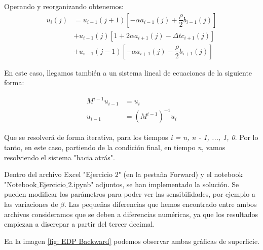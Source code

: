\documentclass[titlepage]{article}
\begin{document}
Operando y reorganizando obtenemos:
\begin{align*}
	u_{i}(j) &=  u_{i-1}(j+1)[-\alpha a_{i-1}(j) + \dfrac{\rho}{2} b_{i-1}(j)] \\ 
	& + u_{i-1}(j)[1 + 2  \alpha a_{i+1}(j) - \Delta t c_{i+1}(j)] \\
	& + u_{i-1}(j-1) [-\alpha a_{i+1}(j) - \dfrac{\rho}{2} b_{i+1}(j)]
\end{align*}

En este caso, llegamos también a un sistema lineal de ecuaciones de la siguiente forma:

\begin{align*}
	M^{i-1}u_{i-1} &= u_{i} \\
	u_{i-1} &= (M^{i-1})^{-1} u_{i}
\end{align*}

Que se resolverá de forma iterativa, para los tiempos \textit{i = n, n - 1, ..., 1, 0}. Por lo tanto, en este caso, partiendo de la condición final, en tiempo \textit{n}, vamos resolviendo el sistema "hacia atrás".

\vspace{5pt}
Dentro del archivo Excel "Ejercicio 2" (en la pestaña Forward) y el notebook "Notebook$\_$Ejercicio$\_$2.ipynb" adjuntos, se han implementado la solución. Se pueden modificar los parámetros para poder ver las sensibilidades, por ejemplo a las variaciones de $\beta$. Las pequeñas diferencias que hemos encontrado entre ambos archivos consideramos que se deben a diferencias numéricas, ya que los resultados empiezan a discrepar a partir del tercer decimal.

\vspace{5pt}
En la imagen \ref{fig: EDP Backward} podemos observar ambas gráficas de superficie.
\end{document}
